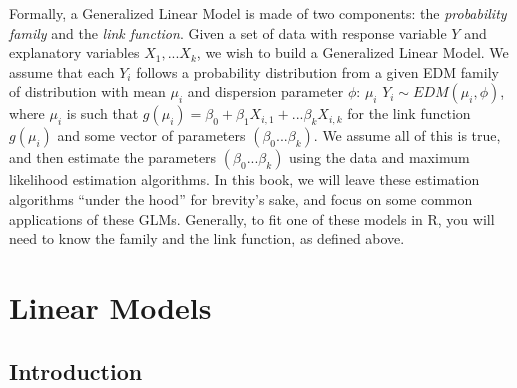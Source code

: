 \documentclass[
]{book}
\begin{document}
Formally, a Generalized Linear Model is made of two components: the \emph{probability family} and the \emph{link function}. Given a set of data with response variable \(Y\) and explanatory variables \(X_1, ... X_k\), we wish to build a Generalized Linear Model. We assume that each \(Y_i\) follows a probability distribution from a given EDM family of distribution with mean \(\mu_i\) and dispersion parameter \(\phi\): \(\mu_i\) \(Y_i \sim EDM(\mu_i,\phi)\), where \(\mu_i\) is such that \(g(\mu_i) = \beta_0 + \beta_1X_{i,1} + ... \beta_kX_{i,k}\) for the link function \(g(\mu_i)\) and some vector of parameters \((\beta_0...\beta_k)\). We assume all of this is true, and then estimate the parameters \((\beta_0...\beta_k)\) using the data and maximum likelihood estimation algorithms. In this book, we will leave these estimation algorithms ``under the hood'' for brevity's sake, and focus on some common applications of these GLMs. Generally, to fit one of these models in R, you will need to know the family and the link function, as defined above.

\hypertarget{linear}{%
\chapter{Linear Models}\label{linear}}

\hypertarget{introduction}{%
\section{Introduction}\label{introduction}}
\end{document}
